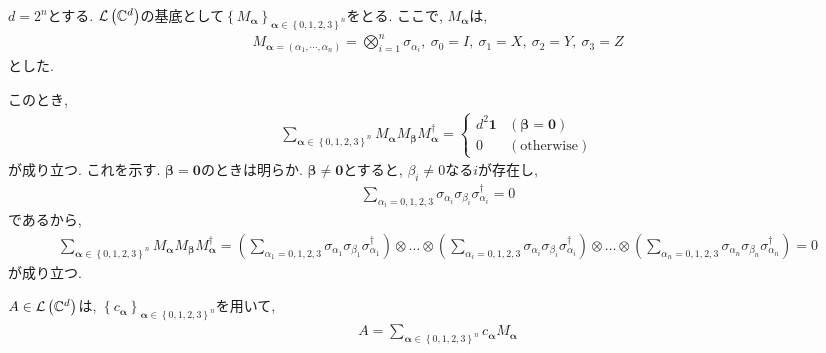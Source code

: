 \begin{ex}
    \label{ex8.19}
    $d = 2^n$とする. $\mathcal{L}\left({\mathbb{C}^d}\right)$の基底として$\left\{M_{\bm{\alpha}}\right\}_{\bm{\alpha}\in\left\{0,1,2,3\right\}^n}$をとる. ここで, $M_{\bm{\alpha}}$は,
    \begin{align*}
        M_{\bm{\alpha} = \left( \alpha_1, \cdots, \alpha_n \right)} = \bigotimes_{i=1}^n \sigma_{\alpha_i},\ 
        \sigma_0 = I, \ \sigma_1 = X, \ \sigma_2 = Y,\ \sigma_3 = Z  
    \end{align*}
    とした. 
    \par
    このとき, 
    \begin{align*}
        \sum_{\bm{\alpha} \in \left\{0,1,2,3\right\}^n}
        M_{\bm{\alpha}} M_{\bm{\beta}} M_{\bm{\alpha}}^\dagger
        =
        \begin{cases}
            d^2 \mathbf{1} & \left(\bm{\beta} = \bm{0}\right) \\
            0 & \left( \text{otherwise}\right)
        \end{cases}
        \tag{$\star$}
    \end{align*}
    が成り立つ. これを示す. $\bm{\beta} = \bm{0}$のときは明らか. $\bm{\beta} \neq \bm{0}$とすると, $\beta_i \neq 0 $なる$i$が存在し, 
    \begin{align*}
        \sum_{\alpha_i = 0,1,2,3}
        \sigma_{\alpha_i} \sigma_{\beta_i}  \sigma_{\alpha_i}^\dagger
        =
        0
    \end{align*}
    であるから,
    \begin{align*}
        \sum_{\bm{\alpha} \in \left\{0,1,2,3\right\}^n}
        M_{\bm{\alpha}} M_{\bm{\beta}} M_{\bm{\alpha}}^\dagger
        =
        \left(
            \sum_{\alpha_1 = 0,1,2,3}
            \sigma_{\alpha_1} \sigma_{\beta_1}  \sigma_{\alpha_1}^\dagger
        \right)
        \otimes
        \dots
        \otimes
        \left(
            \sum_{\alpha_i = 0,1,2,3}
            \sigma_{\alpha_i} \sigma_{\beta_i}  \sigma_{\alpha_i}^\dagger
        \right)
        \otimes
        \dots
        \otimes
        \left(
            \sum_{\alpha_n = 0,1,2,3}
            \sigma_{\alpha_n} \sigma_{\beta_n}  \sigma_{\alpha_n}^\dagger
        \right)
        =
        0
    \end{align*}
    が成り立つ.
    \par
    $A \in \mathcal{L}\left({\mathbb{C}^d}\right)$は, $\left\{c_{\bm{\alpha}}\right\}_{\bm{\alpha} \in \left\{0,1,2,3\right\}^n}$を用いて,
    \begin{align*}
        A = \sum_{\bm{\alpha} \in \left\{0,1,2,3\right\}^n} c_{\bm{\alpha}} M_{\bm{\alpha}}

\end{align*}
\end{ex}
